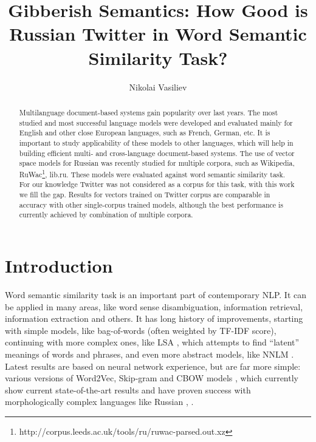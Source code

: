 \documentclass{llncs}
\begin{document}
\title{Gibberish Semantics: How Good is Russian Twitter in Word Semantic Similarity Task?}
%
\author{Nikolai Vasiliev}
%
%
%

\maketitle              %

\begin{abstract}
Multilanguage document-based systems gain popularity over last years. The most studied and most successful language models were developed and evaluated mainly for English and other close European languages, such as French, German, etc. It is important to study applicability of these models to other languages, which will help in building efficient multi- and cross-language document-based systems. The use of vector space models for Russian was recently studied for multiple corpora, such as Wikipedia, RuWac\footnote{http://corpus.leeds.ac.uk/tools/ru/ruwac-parsed.out.xz}, lib.ru. These models were evaluated against word semantic similarity task. For our knowledge Twitter was not considered as a corpus for this task, with this work we fill the gap. Results for vectors trained on Twitter corpus are comparable in accuracy with other single-corpus trained models, although the best performance is currently achieved by combination of multiple corpora.
\end{abstract}
%
\section{Introduction}
%
Word semantic similarity task is an important part of contemporary NLP. It can be applied in many areas, like word sense disambiguation, information retrieval, information extraction and others. It has long history of improvements, starting with simple models, like bag-of-words (often weighted by TF-IDF score), continuing with more complex ones, like LSA \cite{LSA}, which attempts to find “latent” meanings of words and phrases, and even more abstract models, like NNLM \cite{NNLM}. Latest results are based on neural network experience, but are far more simple: various versions of Word2Vec, Skip-gram and CBOW models \cite{Word2Vec}, which currently show current state-of-the-art results and have proven success with morphologically complex languages like Russian \cite{Arefyev}, \cite{Panchenko2015}. 
\end{document}
